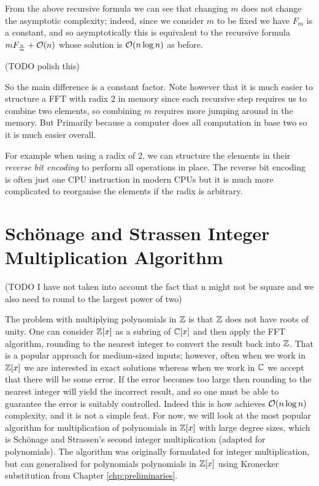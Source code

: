 From the above recursive formula we can see that changing $m$ does not change the asymptotic complexity; indeed, since we consider $m$ to be fixed we have $F_m$ is a constant, and so asymptotically this is equivalent to the recursive formula $mF_{\frac{n}{m}} + \mathcal O(n)$ whose solution is $\mathcal O(n \log n)$ as before. 

\medskip
(TODO polish this)
\medskip

So the main difference is a constant factor. Note however that it is much easier to structure a FFT with radix $2$ in memory since each recursive step requires us to combine two elements, so combining $m$ requires more jumping around in the memory. But Primarily because a computer does all computation in base two so it is much easier overall.

For example when using a radix of 2, we can structure the elements in their \emph{reverse bit encoding} to perform all operations in place. The reverse bit encoding is often just one CPU instruction in modern CPUs but it is much more complicated to reorganise the elements if the radix is arbitrary.


\section{Sch\"{o}nage and Strassen Integer Multiplication Algorithm}
\label{sec:schon-strass}

(TODO I have not taken into account the fact that n might not be square and we also need to round to the largest power of two)

The problem with multiplying polynomials in ${\mathbb Z}$ is that ${\mathbb Z}$ does not have roots of unity. One can consider ${\mathbb Z}[x]$ as a subring of ${\mathbb C}[x]$ and then apply the FFT algorithm, rounding to the nearest integer to convert the result back into ${\mathbb Z}$. That is a popular approach for medium-sized inputs; however, often when we work in ${\mathbb Z}[x]$ we are interested in exact solutions whereas when we work in ${\mathbb C}$ we accept that there will be some error. If the error becomes too large then rounding to the nearest integer will yield the incorrect result, and so one must be able to guarantee the error is suitably controlled. Indeed this is how \cite{nlogn} achieves $\mathcal O(n\log n)$ complexity, and it is not a simple feat. For now, we will look at the most popular algorithm for multiplication of polynomials in ${\mathbb Z}[x]$ with large degree sizes, which is Sch\"{o}nage and Strassen's second integer multiplication (adapted for polynomials). The algorithm was originally formulated for integer multiplication, but can generalised for polynomials polynomials in ${\mathbb Z}[x]$ using Kronecker substitution from Chapter \ref{chp:preliminaries}.

